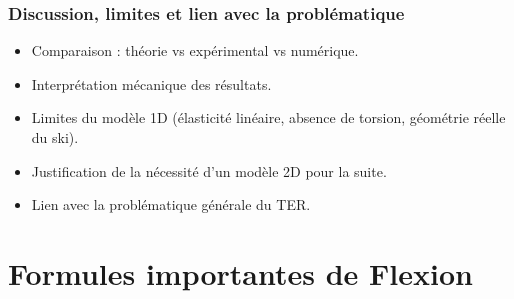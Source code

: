 \documentclass[12pt, a4paper]{article}
\begin{document}
\subsubsection{Discussion, limites et lien avec la problématique}
\begin{itemize}
    \item Comparaison : théorie vs expérimental vs numérique.
    \item Interprétation mécanique des résultats.
    \item Limites du modèle 1D (élasticité linéaire, absence de torsion, géométrie réelle du ski).
    \item Justification de la nécessité d'un modèle 2D pour la suite.
    \item Lien avec la problématique générale du TER.
\end{itemize}



\section{\textbf{Formules importantes de Flexion}}
\end{document}
